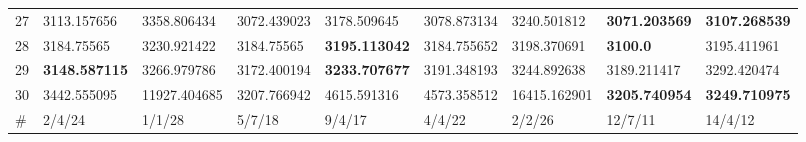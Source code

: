 \begin{table*}[b]
\begin{tabular}{|p{0.8cm}|p{1.6cm}|p{1.6cm}|p{1.6cm}|p{1.6cm}|p{1.6cm}|p{1.6cm}|p{1.6cm}|p{1.6cm}|}
27  & 3113.157656 & 3358.806434 & 3072.439023 & 3178.509645 & 3078.873134 & 3240.501812 & \textbf{3071.203569} & \textbf{3107.268539} \\ 
28  & 3184.75565 & 3230.921422 & 3184.75565 & \textbf{3195.113042} & 3184.755652 & 3198.370691 & \textbf{3100.0} & 3195.411961 \\ 
29  & \textbf{3148.587115} & 3266.979786 & 3172.400194 & \textbf{3233.707677} & 3191.348193 & 3244.892638 & 3189.211417 & 3292.420474 \\ 
30  & 3442.555095 & 11927.404685 & 3207.766942 & 4615.591316 & 4573.358512 & 16415.162901 & \textbf{3205.740954} & \textbf{3249.710975} \\
\hline
\#  & 2/4/24 & 1/1/28 & 5/7/18 & 9/4/17 & 4/4/22 & 2/2/26 & 12/7/11 & 14/4/12 \\
\hline

\end{tabular}
\end{table*}

